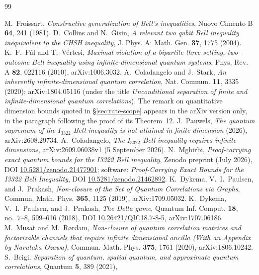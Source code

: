 \documentclass[11pt]{article}
\theoremstyle{remark}
\begin{document}
\begin{thebibliography}{99}
\small
\raggedright
\setlength{\itemsep}{2pt}
 M.~Froissart, \emph{Constructive generalization of
Bell's inequalities}, Nuovo Cimento B \textbf{64}, 241 (1981).
 D.~Collins and N.~Gisin, \emph{A relevant two qubit
Bell inequality inequivalent to the CHSH inequality}, J. Phys. A: Math.
Gen. \textbf{37}, 1775 (2004).
 K.~F.~P\'al and T.~V\'ertesi, \emph{Maximal violation
of a bipartite three-setting, two-outcome Bell inequality using
infinite-dimensional quantum systems}, Phys. Rev. A \textbf{82}, 022116
(2010), arXiv:1006.3032.
 A.~Coladangelo and J.~Stark, \emph{An inherently
infinite-dimensional quantum correlation}, Nat. Commun. \textbf{11}, 3335
(2020); arXiv:1804.05116 (under the title \emph{Unconditional separation of
finite and infinite-dimensional quantum correlations}). The remark on
quantitative dimension bounds quoted in \S\ref{sec:rate-scope} appears in
the arXiv version only, in the paragraph following the proof of its
Theorem~12.
 J.~Pauwels, \emph{The quantum supremum of the
$I_{3322}$ Bell inequality is not attained in finite dimension} (2026),
arXiv:2608.29734.
 A.~Coladangelo, \emph{The $I_{3322}$ Bell
inequality requires infinite dimensions}, arXiv:2609.06038v1
(5 September 2026).
 N.~Mghirbi, \emph{Proof-carrying exact quantum bounds
for the I3322 Bell inequality}, Zenodo preprint (July 2026),
DOI \href{https://doi.org/10.5281/zenodo.21477901}{10.5281/zenodo.21477901};
software: \emph{Proof-Carrying Exact Bounds for the I3322 Bell Inequality},
DOI \href{https://doi.org/10.5281/zenodo.21462892}{10.5281/zenodo.21462892}.
 K.~Dykema, V.~I.~Paulsen, and J.~Prakash, \emph{Non-closure
of the Set of Quantum Correlations via Graphs}, Commun. Math. Phys.
\textbf{365}, 1125 (2019), arXiv:1709.05032.
 K.~Dykema, V.~I.~Paulsen, and J.~Prakash, \emph{The
Delta game}, Quantum Inf. Comput. \textbf{18}, no.~7--8, 599--616 (2018),
DOI \href{https://doi.org/10.26421/QIC18.7-8-5}{10.26421/QIC18.7-8-5},
arXiv:1707.06186.
 M.~Musat and M.~R{\o}rdam, \emph{Non-closure of
quantum correlation matrices and factorizable channels that require
infinite dimensional ancilla (With an Appendix by Narutaka Ozawa)},
Commun. Math. Phys. \textbf{375}, 1761 (2020), arXiv:1806.10242.
 S.~Beigi, \emph{Separation of quantum, spatial quantum,
and approximate quantum correlations}, Quantum \textbf{5}, 389 (2021),

\end{thebibliography}
\end{document}
